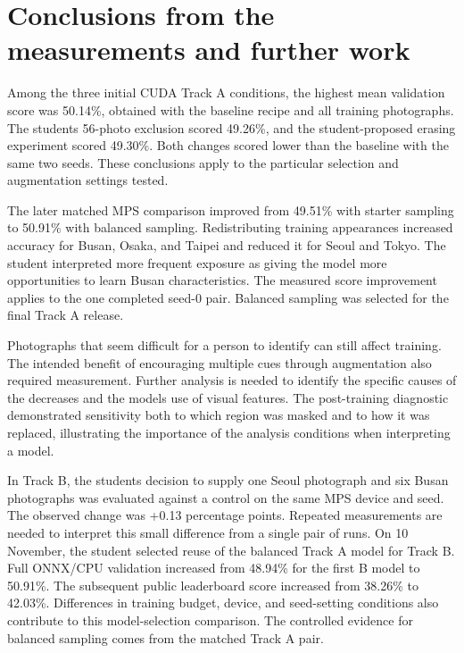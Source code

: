 \documentclass[11pt]{article}
\begin{document}
\section{Conclusions from the measurements and further work}

Among the three initial CUDA Track A conditions, the highest mean validation score was
50.14\%, obtained with the baseline recipe and all training photographs.
The student\textquotesingle{}s 56-photo exclusion scored 49.26\%, and the student-proposed
erasing experiment scored 49.30\%. Both changes scored lower than the
baseline with the same two seeds. These conclusions apply to the particular
selection and augmentation settings tested.

The later matched MPS comparison improved from 49.51\% with starter sampling
to 50.91\% with balanced sampling. Redistributing training appearances
increased accuracy for Busan, Osaka, and Taipei and reduced it for Seoul and
Tokyo. The student interpreted more frequent exposure as giving the model
more opportunities to learn Busan characteristics. The measured score
improvement applies to the one completed seed-0 pair. Balanced sampling
was selected for the final Track A release.

Photographs that seem difficult for a person to identify can still affect
training. The intended benefit of encouraging multiple cues through
augmentation also required measurement. Further analysis is needed to
identify the specific causes of the decreases and the model\textquotesingle{}s use of visual
features. The post-training diagnostic demonstrated sensitivity both to
which region was masked and to how it was replaced, illustrating the
importance of the analysis conditions when interpreting a model.

In Track B, the student\textquotesingle{}s decision to supply one Seoul photograph and six
Busan photographs was evaluated against a control on the same MPS device
and seed. The observed change was +0.13 percentage points. Repeated
measurements are needed to interpret this small difference from a single
pair of runs. On 10 November, the student selected reuse of the balanced
Track A model for Track B. Full ONNX/CPU validation increased from 48.94\%
for the first B model to 50.91\%. The subsequent public leaderboard score
increased from 38.26\% to 42.03\%. Differences in training budget, device,
and seed-setting conditions also contribute to this model-selection
comparison. The controlled evidence for balanced sampling comes from the
matched Track A pair.
\end{document}
